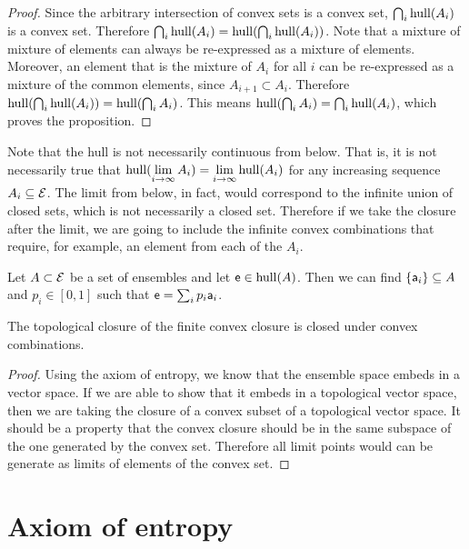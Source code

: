 \begin{mathSection}
\begin{proof}
	Since the arbitrary intersection of convex sets is a convex set, $\bigcap_i \hull(A_i)$ is a convex set. Therefore $\bigcap_i \hull(A_i) = \hull(\bigcap_i \hull(A_i))$. Note that a mixture of mixture of elements can always be re-expressed as a mixture of elements. Moreover, an element that is the mixture of $A_i$ for all $i$ can be re-expressed as a mixture of the common elements, since $A_{i+1} \subset A_i$. Therefore $\hull(\bigcap_i \hull(A_i)) = \hull(\bigcap_i A_i)$. This means $\hull(\bigcap_i A_i) = \bigcap_i \hull(A_i)$, which proves the proposition.
\end{proof}

\begin{remark}
	Note that the hull is not necessarily continuous from below. That is, it is not necessarily true that $\hull(\lim\limits_{i \to \infty} A_i) = \lim\limits_{i \to \infty} \hull(A_i)$ for any increasing sequence $A_i \subseteq \Ens$. The limit from below, in fact, would correspond to the infinite union of closed sets, which is not necessarily a closed set. Therefore if we take the closure after the limit, we are going to include the infinite convex combinations that require, for example, an element from each of the $A_i$.
\end{remark}
\end{mathSection}

\begin{conj}
	Let $A \subset \Ens$ be a set of ensembles and let $\ens \in \hull(A)$. Then we can find  $\{\ens[a]_i\} \subseteq A$ and $p_i \in [0,1]$ such that $\ens = \sum_i p_i \ens[a]_i$.
\end{conj}

\begin{conj}
	The topological closure of the finite convex closure is closed under convex combinations.
\end{conj}

\begin{proof}
	Using the axiom of entropy, we know that the ensemble space embeds in a vector space. If we are able to show that it embeds in a topological vector space, then we are taking the closure of a convex subset of a topological vector space. It should be a property that the convex closure should be in the same subspace of the one generated by the convex set. Therefore all limit points would can be generate as limits of elements of the convex set.
\end{proof}

\section{Axiom of entropy}


